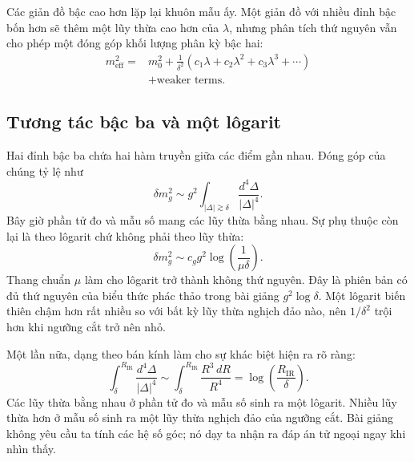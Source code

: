 Các giản đồ bậc cao hơn lặp lại khuôn mẫu ấy. Một giản đồ với nhiều đỉnh bậc bốn hơn sẽ thêm một lũy thừa cao hơn của \(\lambda\), nhưng phân tích thứ nguyên vẫn cho phép một đóng góp khối lượng phân kỳ bậc hai:
\begin{equation}
\begin{aligned}
m_{\mathrm{eff}}^2
={}&m_0^2
+\frac{1}{\delta^2}
\left(c_1\lambda+c_2\lambda^2+c_3\lambda^3+\cdots\right)\\
&+\text{weaker terms}.
\end{aligned}
\label{eq:scalar-mass-series}
\end{equation}

\subsection{Tương tác bậc ba và một lôgarit}

Hai đỉnh bậc ba chứa hai hàm truyền giữa các điểm gần nhau. Đóng góp của chúng tỷ lệ như
\begin{equation}
\delta m_g^2
\sim
g^2\int_{|\Delta|\gtrsim\delta}
\frac{d^4\Delta}{|\Delta|^4}.
\label{eq:cubic-loop}
\end{equation}
Bây giờ phần tử đo và mẫu số mang các lũy thừa bằng nhau. Sự phụ thuộc còn lại là theo lôgarit chứ không phải theo lũy thừa:
\begin{equation}
\delta m_g^2
\sim
c_g g^2\log\!\left(\frac{1}{\mu\delta}\right).
\label{eq:cubic-log}
\end{equation}
Thang chuẩn \(\mu\) làm cho lôgarit trở thành không thứ nguyên. Đây là phiên bản có đủ thứ nguyên của biểu thức phác thảo trong bài giảng \(g^2\log\delta\). Một lôgarit biến thiên chậm hơn rất nhiều so với bất kỳ lũy thừa nghịch đảo nào, nên \(1/\delta^2\) trội hơn khi ngưỡng cắt trở nên nhỏ.

Một lần nữa, dạng theo bán kính làm cho sự khác biệt hiện ra rõ ràng:
\begin{equation}
\int_{\delta}^{R_{\mathrm{IR}}}
\frac{d^4\Delta}{|\Delta|^4}
\sim
\int_{\delta}^{R_{\mathrm{IR}}}\frac{R^3\,dR}{R^4}
=\log\!\left(\frac{R_{\mathrm{IR}}}{\delta}\right).
\end{equation}
Các lũy thừa bằng nhau ở phần tử đo và mẫu số sinh ra một lôgarit. Nhiều lũy thừa hơn ở mẫu số sinh ra một lũy thừa nghịch đảo của ngưỡng cắt. Bài giảng không yêu cầu ta tính các hệ số góc; nó dạy ta nhận ra đáp án tử ngoại ngay khi nhìn thấy.

\begin{classroomqa}
\end{classroomqa}

